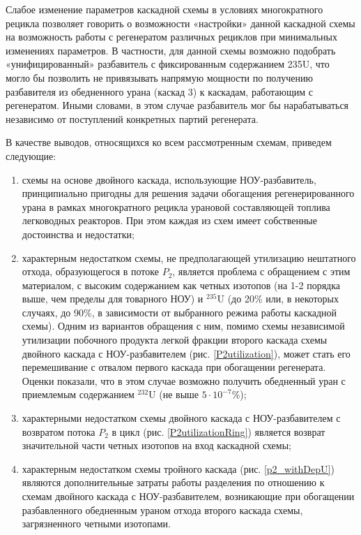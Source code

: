 Слабое изменение параметров каскадной схемы в условиях многократного рецикла позволяет говорить о возможности «настройки» данной каскадной схемы на возможность работы с регенератом различных рециклов при минимальных изменениях параметров. В частности, для данной схемы возможно подобрать «унифицированный» разбавитель с фиксированным содержанием 235U, что могло бы позволить не привязывать напрямую мощности по получению разбавителя из обедненного урана (каскад 3) к каскадам, работающим с регенератом. Иными словами, в этом случае разбавитель мог бы нарабатываться независимо от поступлений конкретных партий регенерата.



В качестве выводов, относящихся ко всем рассмотренным схемам, приведем следующие:
\begin{enumerate}
    \item схемы на основе двойного каскада, использующие НОУ-разбавитель, принципиально пригодны для решения задачи обогащения регенерированного урана в рамках многократного рецикла урановой составляющей топлива легководных реакторов. При этом каждая из схем имеет собственные достоинства и недостатки;
    \item характерным недостатком схемы, не предполагающей утилизацию нештатного отхода, образующегося в потоке $P_2$, является проблема с обращением с этим материалом, с высоким содержанием как четных изотопов (на 1-2 порядка выше, чем пределы для товарного НОУ) и $^{235}$U (до 20\% или, в некоторых случаях, до 90\%, в зависимости от выбранного режима работы каскадной схемы). Одним из вариантов обращения с ним, помимо схемы независимой утилизации побочного продукта легкой фракции второго каскада схемы двойного каскада с НОУ-разбавителем (рис. \ref{P2utilization}), может стать его перемешивание с отвалом первого каскада при обогащении регенерата. Оценки показали, что в этом случае возможно получить обедненный уран с приемлемым содержанием $^{232}$U (не выше $5\cdot10^{-7}$\%);
    \item характерными недостатком схемы двойного каскада с НОУ-разбавителем с возвратом потока $P_2$ в цикл (рис. \ref{P2utilizationRing}) является возврат значительной части четных изотопов на вход каскадной схемы;
    \item характерным недостатком схемы тройного каскада (рис. \ref{p2_withDepU}) являются дополнительные затраты работы разделения по отношению к схемам двойного каскада с НОУ-разбавителем, возникающие при обогащении разбавленного обедненным ураном отхода второго каскада схемы, загрязненного четными изотопами.
  \end{enumerate}

